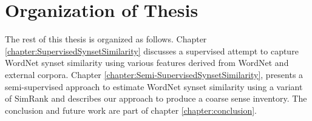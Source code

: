 \section{Organization of Thesis}
The rest of this thesis is organized as follows. 
Chapter \ref{chapter:SupervisedSynsetSimilarity} discusses a supervised attempt to capture WordNet synset similarity using various features derived from WordNet and external corpora. 
Chapter \ref{chapter:Semi-SupervisedSynsetSimilarity}, presents a semi-supervised approach to estimate WordNet synset similarity using a variant of SimRank \citep{Jeh02simrank} and describes our approach to produce a coarse sense inventory. 
The conclusion and future work are part of chapter \ref{chapter:conclusion}.

